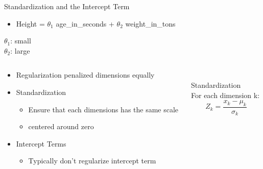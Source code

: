 \documentclass[aspectratio=169]{../latex_main/tntbeamer}  %
\begin{document}
	
	\begin{frame}{Standardization and the Intercept Term}
	    \begin{itemize}
	        \item Height = $\theta_1$ age\_in\_seconds + $\theta_2$ weight\_in\_tons
	    \end{itemize}
	    $\theta_1$: small\\
	    $\theta_2$: large
	    \begin{columns}
	        \begin{column}{.5\textwidth}
	                \begin{itemize}
	                    \item Regularization penalized dimensions equally
	                    \item Standardization
	                    \begin{itemize}
	                        \item Ensure that each dimensions has the same scale
	                        \item centered around zero
	                    \end{itemize}
	                    \item Intercept Terms
	                    \begin{itemize}
	                        \item Typically don’t regularize intercept term 
	                    \end{itemize}
	                \end{itemize}
	        \end{column}
	        
	        \begin{column}{.5\textwidth}
	                \\ 
	                Standardization\\
	                For each dimension k:
	                \begin{equation*}
	                    Z_k = \frac{x_k - \mu_k}{\sigma_k}
	                \end{equation*}
	        \end{column}
	    \end{columns}
	\end{frame}
\end{document}

